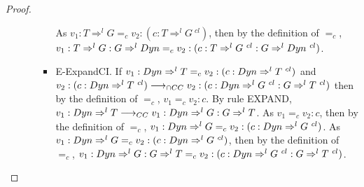 \documentclass[a4paper]{article}
\begin{document}
\begin{proof}
\begin{itemize}
\begin{itemize}
\begin{itemize}
            As $v_1 : T \Rightarrow^l G =_c v_2 : (c : T \Rightarrow^l G\ ^{cl})$, then by the definition of $=_c$, $v_1 : T \Rightarrow^l G : G \Rightarrow^l \Dyn =_c v_2 : (c : T \Rightarrow^l G\ ^{cl} : G \Rightarrow^l \Dyn\ ^{cl})$.
            \item E-ExpandCI.
            If $v_1 : Dyn \Rightarrow^l T =_c v_2 : (c : Dyn \Rightarrow^l T\ ^{cl})$ and $v_2 : (c : \Dyn \Rightarrow^l T\ ^{cl}) \gios v_2 : (c : \Dyn \Rightarrow^l G\ ^{cl} : G \Rightarrow^l T\ ^{cl})$ then by the definition of $=_c$, $v_1 =_c v_2 : c$.
            By rule EXPAND, $v_1 : Dyn \Rightarrow^l T \longrightarrow_{CC} v_1 : Dyn \Rightarrow^l G : G \Rightarrow^l T$.
            As $v_1 =_c v_2 : c$, then by the definition of $=_c$, $v_1 : \Dyn \Rightarrow^l G =_c v_2 : (c : \Dyn \Rightarrow^l G\ ^{cl})$.
            As $v_1 : \Dyn \Rightarrow^l G =_c v_2 : (c : \Dyn \Rightarrow^l G\ ^{cl})$, then by the definition of $=_c$, $v_1 : \Dyn \Rightarrow^l G : G \Rightarrow^l T =_c v_2 : (c : \Dyn \Rightarrow^l G\ ^{cl} : G \Rightarrow^l T\ ^{cl})$.
        \end{itemize}
    \end{itemize}
\end{itemize}
\end{proof}
\end{document}
